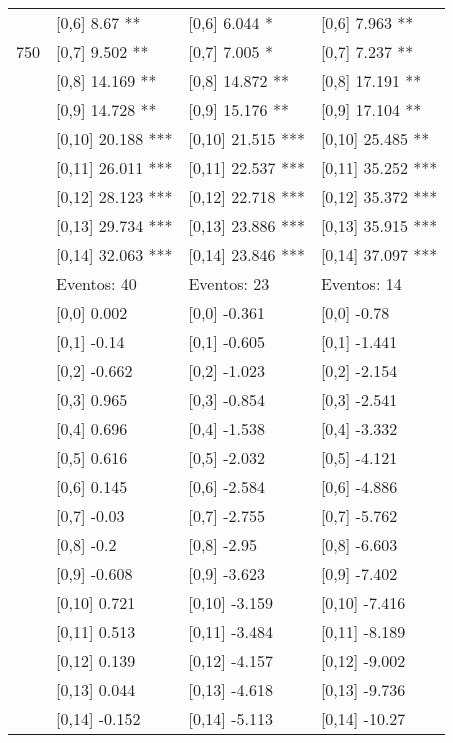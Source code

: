 \begin{table}
\begin{tabular}[t]{llll}
 & {}[0,6] 8.67 ** & {}[0,6] 6.044 * & {}[0,6] 7.963 **\\
750 & {}[0,7] 9.502 ** & {}[0,7] 7.005 * & {}[0,7] 7.237 **\\
\addlinespace
 & {}[0,8] 14.169 ** & {}[0,8] 14.872 ** & {}[0,8] 17.191 **\\
 & {}[0,9] 14.728 ** & {}[0,9] 15.176 ** & {}[0,9] 17.104 **\\
 & {}[0,10] 20.188 *** & {}[0,10] 21.515 *** & {}[0,10] 25.485 **\\
 & {}[0,11] 26.011 *** & {}[0,11] 22.537 *** & {}[0,11] 35.252 ***\\
 & {}[0,12] 28.123 *** & {}[0,12] 22.718 *** & {}[0,12] 35.372 ***\\
\addlinespace
 & {}[0,13] 29.734 *** & {}[0,13] 23.886 *** & {}[0,13] 35.915 ***\\
 & {}[0,14] 32.063 *** & {}[0,14] 23.846 *** & {}[0,14] 37.097 ***\\
 & Eventos:  40 & Eventos:  23 & Eventos:  14\\
 & {}[0,0] 0.002 & {}[0,0] -0.361 & {}[0,0] -0.78\\
 & {}[0,1] -0.14 & {}[0,1] -0.605 & {}[0,1] -1.441\\
\addlinespace
 & {}[0,2] -0.662 & {}[0,2] -1.023 & {}[0,2] -2.154\\
 & {}[0,3] 0.965 & {}[0,3] -0.854 & {}[0,3] -2.541\\
 & {}[0,4] 0.696 & {}[0,4] -1.538 & {}[0,4] -3.332\\
 & {}[0,5] 0.616 & {}[0,5] -2.032 & {}[0,5] -4.121\\
 & {}[0,6] 0.145 & {}[0,6] -2.584 & {}[0,6] -4.886\\
\addlinespace
1000 & {}[0,7] -0.03 & {}[0,7] -2.755 & {}[0,7] -5.762\\
 & {}[0,8] -0.2 & {}[0,8] -2.95 & {}[0,8] -6.603\\
 & {}[0,9] -0.608 & {}[0,9] -3.623 & {}[0,9] -7.402\\
 & {}[0,10] 0.721 & {}[0,10] -3.159 & {}[0,10] -7.416\\
 & {}[0,11] 0.513 & {}[0,11] -3.484 & {}[0,11] -8.189\\
\addlinespace
 & {}[0,12] 0.139 & {}[0,12] -4.157 & {}[0,12] -9.002\\
 & {}[0,13] 0.044 & {}[0,13] -4.618 & {}[0,13] -9.736\\
 & {}[0,14] -0.152 & {}[0,14] -5.113 & {}[0,14] -10.27\\
\bottomrule
\end{tabular}
\end{table}
